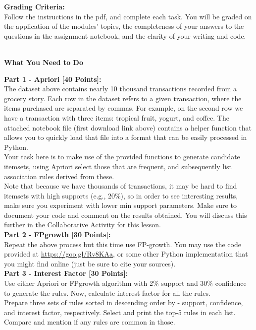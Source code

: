 \documentclass[letter-paper,12pt]{article} %
\begin{document}
\textbf{Grading Criteria:}\\
Follow the instructions in the pdf, and complete each task. You will be graded on the application of the modules’ topics, the completeness of your answers to the questions in the assignment notebook, and the clarity of your writing and code.\\~\\


\newpage

\begin{center}
    \Large \textbf{What You Need to Do}
\end{center}

\textbf{Part 1 - Apriori [40 Points]:}\\

The dataset above contains nearly 10 thousand transactions recorded from a grocery story. Each row in the dataset refers to a given transaction, where the items purchased are separated by commas. For example, on the second row we have a transaction with three items: {tropical fruit, yogurt, and coffee}. The attached notebook file (first download link above) contains a helper function that allows you to quickly load that file into a format that can be easily processed in Python.\\

Your task here is to make use of the provided functions to generate candidate itemsets, using Apriori select those that are frequent, and subsequently list association rules derived from these.\\

Note that because we have thousands of transactions, it may be hard to find itemsets with high supports (e.g., 20\%), so in order to see interesting results, make sure you experiment with lower min support parameters. Make sure to document your code and comment on the results obtained. You will discuss this further in the Collaborative Activity for this lesson.\\


\textbf{Part 2 - FPgrowth [30 Points]:}\\

Repeat the above process but this time use FP-growth. You may use the code provided
at \url{https://goo.gl/Rv8KAa}, or some other Python implementation that you might find online (just be sure to cite your sources).\\


\textbf{Part 3 - Interest Factor [30 Points]:}\\

Use either Apriori or FPgrowth algorithm with 2\% support and 30\% confidence to generate the rules. Now, calculate interest factor for all the rules. \\

Prepare three sets of rules sorted in descending order by - support, confidence, and interest factor, respectively. Select and print the top-5 rules in each list.  Compare and mention if any rules are common in those. 
\end{document}
